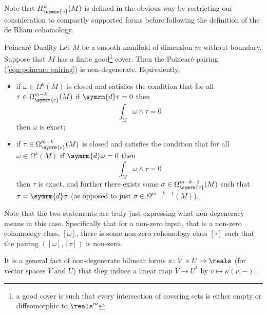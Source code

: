 \documentclass[fleqn]{NotesClass}
\renewcommand{\dl}{\symrm{d}}
\newcommand{\compact}{\symrm{c}}
\begin{document}
    Note that \(H^k_{\compact}(M)\) is defined in the obvious way by restricting our consideration to compactly supported forms before following the definition of the de Rham cohomology.
    
    \begin{thm}{Poincar\'e Duality}{}
        Let \(M\) be a smooth manifold of dimension \(m\) without boundary.
        Suppose that \(M\) has a finite good\footnote{a good cover is such that every intersection of covering sets is either empty or diffeomorphic to \(\reals^m\)} cover.
        Then the Poincar\'e pairing (\cref{eqn:poincare pairing}) is non-degenerate.
        Equivalently,
        \begin{itemize}
            \item if \(\omega \in \Omega^k(M)\) is closed and satisfies the condition that for all \(\tau \in \Omega^{m-k}_{\compact}(M)\) if \(\dl \tau = 0\) then
            \begin{equation}
                \int_M \omega \wedge \tau = 0
            \end{equation}
            then \(\omega\) is exact;
            \item if \(\tau \in \Omega_{\compact}^{m - k}(M)\) is closed and satisfies the condition that for all \(\omega \in \Omega^k(M)\) if \(\dl \omega = 0\) then
            \begin{equation}
                \int_M \omega \wedge \tau = 0
            \end{equation}
            then \(\tau\) is exact, and further there exists some \(\sigma \in \Omega_{\compact}^{m - k - 1}(M)\) such that \(\tau = \dl \sigma\) (as opposed to just \(\sigma \in \Omega^{m - k - 1}(M)\)).
        \end{itemize}
    \end{thm}
    
    Note that the two statements are truly just expressing what non-degeneracy means in this case.
    Specifically that for a non-zero input, that is a non-zero cohomology class, \([\omega]\), there is some non-zero cohomology class \([\tau]\) such that the pairing \(([\omega], [\tau])\) is non-zero.
    
    It is a general fact of non-degenerate bilinear forms \(\kappa \colon V \times U \to \reals\) (for vector spaces \(V\) and \(U\)) that they induce a linear map \(V \to U^*\) by \(v \mapsto \kappa(v, -)\).
    
\end{document}
